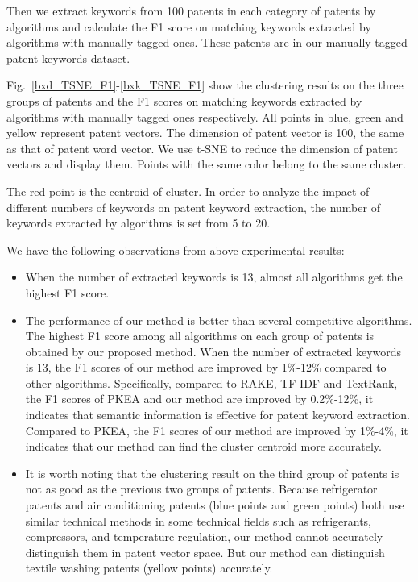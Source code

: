 \documentclass[conference]{IEEEtran}
\begin{document}
	Then we extract keywords from 100 patents in each category of patents by algorithms and calculate the F1 score on matching keywords extracted by algorithms with manually tagged ones. These patents are in our manually tagged patent keywords dataset.
	
	Fig.~\ref{bxd_TSNE_F1}-\ref{bxk_TSNE_F1} show the clustering results on the three groups of patents and the F1 scores on matching keywords extracted by algorithms with manually tagged ones respectively. All points in blue, green and yellow represent patent vectors. The dimension of patent vector is 100, the same as that of patent word vector. We use t-SNE \cite{b27} to reduce the dimension of patent vectors and display them. Points with the same color belong to the same cluster. 
	
	The red point is the centroid of cluster. In order to analyze the impact of different numbers of keywords on patent keyword extraction, the number of keywords extracted by algorithms is set from 5 to 20.

	We have the following observations from above experimental results:
	\begin{itemize}
		\item When the number of extracted keywords is 13, almost all algorithms get the highest F1 score.
		\item The performance of our method is better than several competitive algorithms. The highest F1 score among all algorithms on each group of patents is obtained by our proposed method. When the number of extracted keywords is 13, the F1 scores of our method are improved by 1\%-12\% compared to other algorithms. Specifically, compared to RAKE, TF-IDF and TextRank, the F1 scores of PKEA and our method are improved by 0.2\%-12\%, it indicates that semantic information is effective for patent keyword extraction. Compared to PKEA, the F1 scores of our method are improved by 1\%-4\%, it indicates that our method can find the cluster centroid more accurately.
		\item It is worth noting that the clustering result on the third group of patents is not as good as the previous two groups of patents. Because refrigerator patents and air conditioning patents (blue points and green points) both use similar technical methods in some technical fields such as refrigerants, compressors, and temperature regulation, our method cannot accurately distinguish them in patent vector space. But our method can distinguish textile washing patents (yellow points) accurately.
	\end{itemize}
	
\end{document}
